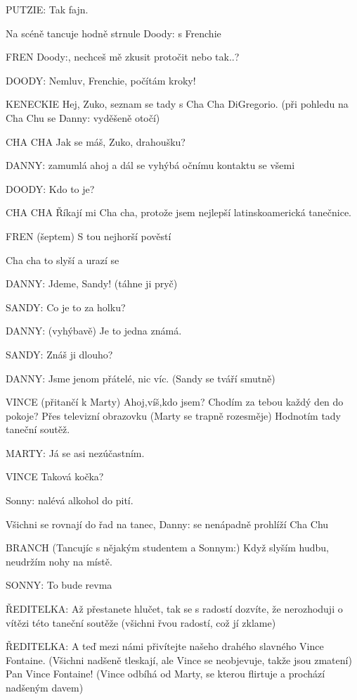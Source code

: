 \rep PUTZIE:        Tak fajn. 

Na scéně tancuje hodně strnule \rep Doody: s Frenchie

FREN        \rep Doody:, nechceš mě zkusit protočit nebo tak..?

\rep DOODY:        Nemluv, Frenchie, počítám kroky! 

KENECKIE        Hej, Zuko, seznam se tady s Cha Cha DiGregorio. (při pohledu na Cha         Chu se \rep Danny: vyděšeně otočí)

CHA CHA         Jak se máš, Zuko, drahoušku?

\rep DANNY:        zamumlá ahoj a dál se vyhýbá očnímu kontaktu se všemi 

\rep DOODY:        Kdo to je? 

CHA CHA        Říkají mi Cha cha, protože jsem nejlepší latinskoamerická tanečnice. 

FREN        (šeptem) S tou nejhorší pověstí

Cha cha to slyší a urazí se 

\rep DANNY:        Jdeme, Sandy! (táhne ji pryč)

\rep SANDY:         Co je to za holku? 

\rep DANNY:        (vyhýbavě) Je to jedna známá.  

\rep SANDY:        Znáš ji dlouho? 

\rep DANNY:        Jsme jenom přátelé, nic víc. (Sandy se tváří smutně) 

VINCE        (přitančí k Marty) Ahoj,víš,kdo jsem? Chodím za tebou každý den do pokoje? Přes televizní obrazovku (Marty se trapně rozesměje) Hodnotím tady taneční soutěž. 

\rep MARTY:        Já se asi nezúčastním.

VINCE        Taková kočka? 

\rep Sonny: nalévá alkohol do pití.

Všichni se rovnají do řad na tanec, \rep Danny: se nenápadně prohlíží Cha Chu 

BRANCH (Tancujíc s nějakým studentem a \rep Sonnym:) Když slyším hudbu, neudržím nohy na místě. 

\rep SONNY:        To bude revma

\rep ŘEDITELKA:         Až přestanete hlučet, tak se s radostí dozvíte, že nerozhoduji o vítězi této taneční soutěže (všichni řvou radostí, což jí zklame) 

\rep ŘEDITELKA:        A teď mezi námi přivítejte našeho drahého slavného Vince Fontaine. (Všichni nadšeně tleskají, ale Vince se neobjevuje, takže jsou zmatení) Pan Vince Fontaine! (Vince odbíhá od Marty, se kterou flirtuje a prochází nadšeným davem) 

